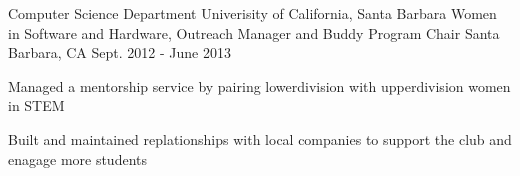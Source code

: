 \begin{cventries}
\cventry
    {Computer Science Department \newline Univerisity of California, Santa Barbara}
    {Women in Software and Hardware, Outreach Manager and Buddy Program Chair}
    {Santa Barbara, CA}
    {Sept. 2012 - June 2013}
    {
      \begin{cvitems}
	\item{Managed a mentorship service by pairing lowerdivision with upperdivision women in STEM}
        \item {Built and maintained replationships with local companies to support the club and enagage more students}
      \end{cvitems}
    }
  \end{cventries}
